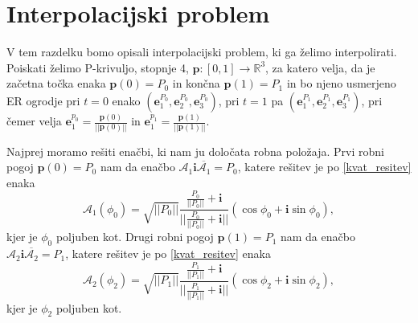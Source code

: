 \documentclass[mat1]{fmfdelo}
\newcommand{\R}{\mathbb R}
\newcommand{\ii}{\boldsymbol i}
\newcommand{\pp}{\boldsymbol p}
\newcommand{\e}{\boldsymbol e}
\newcommand{\oo}{\boldsymbol o}
\newcommand{\uu}{\boldsymbol u}
\newcommand{\vv}{\boldsymbol v}
\newcommand{\A}{\mathcal A}
\begin{document}
\fi





\iffalse 

Ko sestavimo vse stvari skupaj, opišemo naš postopek z naslednjim algoritmom.\\
\textbf{Vhodni podatki:} začetna točka $\pp_z = d_z \oo_z$, končna točka $\pp_k = d_k \oo_k$, usmerjenost končnih točk $\left( \oo_z, \uu_z, \vv_z\right)$,  $\left( \oo_k, \uu_k, \vv_k\right)$, $\oo_z != \oo_k$.
\begin{enumerate}
	\item a
	\item b
\end{enumerate}
\fi

\section{Interpolacijski problem}{\label{int_problem}}
V tem razdelku bomo opisali interpolacijski problem, ki ga želimo interpolirati. Poiskati želimo P-krivuljo, stopnje 4, $\pp:\left[0,1\right] \rightarrow \R^3$, za katero velja, da je začetna točka enaka $\pp(0) = P_0$ in končna $\pp(1)=P_1$ in bo njeno usmerjeno ER ogrodje pri $t=0$ enako $\left( \e_1^{P_0},\e_2^{P_0},\e_3^{P_0} \right)$, pri $t=1$ pa $\left( \e_1^{P_1},\e_2^{P_1},\e_3^{P_1} \right)$, pri čemer velja $\e_1^{p_0}= \frac{\pp(0)}{||\pp(0)||}$ in $\e_1^{p_1}= \frac{\pp(1)}{||\pp(1)||}$.

	Najprej moramo rešiti enačbi, ki nam ju določata robna položaja.
	Prvi robni pogoj $\pp(0) = P_0$ nam da enačbo $\A_1 \ii \overline{\A_1} = P_0$, katere rešitev je po \ref{kvat_resitev} enaka 
	\begin{equation}
		\A_1(\phi_0) = \sqrt{||P_0||} \frac{\frac{P_0}{||P_0||}+\ii}{||\frac{P_0}{||P_0||}+\ii||} \left( \cos \phi_0 + \ii \sin \phi_0 \right),
	\end{equation}
	kjer je $\phi_0$ poljuben kot.
	Drugi robni pogoj $\pp(1) = P_1$ nam da enačbo $\A_2 \ii \overline{\A_2} = P_1$, katere rešitev je po \ref{kvat_resitev} enaka 
	\begin{equation}
	\A_2(\phi_2) = \sqrt{||P_1||} \frac{\frac{P_1}{||P_1||}+\ii}{||\frac{P_1}{||P_1||}+\ii||} \left( \cos \phi_2 + \ii \sin \phi_2 \right),
	\end{equation}
	kjer je $\phi_2$ poljuben kot.
	
\end{document}
